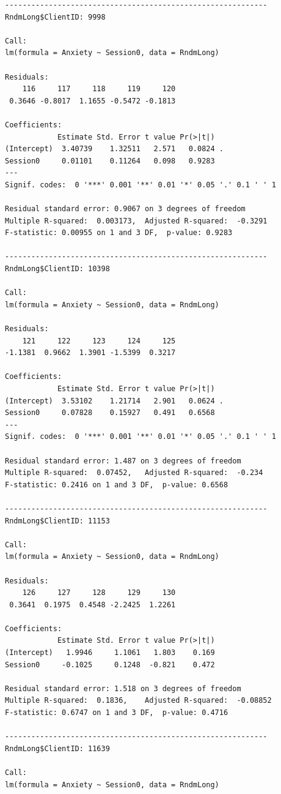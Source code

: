 \documentclass[
  11pt,
]{book}
\begin{document}
\begin{verbatim}
------------------------------------------------------------ 
RndmLong$ClientID: 9998

Call:
lm(formula = Anxiety ~ Session0, data = RndmLong)

Residuals:
    116     117     118     119     120 
 0.3646 -0.8017  1.1655 -0.5472 -0.1813 

Coefficients:
            Estimate Std. Error t value Pr(>|t|)  
(Intercept)  3.40739    1.32511   2.571   0.0824 .
Session0     0.01101    0.11264   0.098   0.9283  
---
Signif. codes:  0 '***' 0.001 '**' 0.01 '*' 0.05 '.' 0.1 ' ' 1

Residual standard error: 0.9067 on 3 degrees of freedom
Multiple R-squared:  0.003173,  Adjusted R-squared:  -0.3291 
F-statistic: 0.00955 on 1 and 3 DF,  p-value: 0.9283

------------------------------------------------------------ 
RndmLong$ClientID: 10398

Call:
lm(formula = Anxiety ~ Session0, data = RndmLong)

Residuals:
    121     122     123     124     125 
-1.1381  0.9662  1.3901 -1.5399  0.3217 

Coefficients:
            Estimate Std. Error t value Pr(>|t|)  
(Intercept)  3.53102    1.21714   2.901   0.0624 .
Session0     0.07828    0.15927   0.491   0.6568  
---
Signif. codes:  0 '***' 0.001 '**' 0.01 '*' 0.05 '.' 0.1 ' ' 1

Residual standard error: 1.487 on 3 degrees of freedom
Multiple R-squared:  0.07452,   Adjusted R-squared:  -0.234 
F-statistic: 0.2416 on 1 and 3 DF,  p-value: 0.6568

------------------------------------------------------------ 
RndmLong$ClientID: 11153

Call:
lm(formula = Anxiety ~ Session0, data = RndmLong)

Residuals:
    126     127     128     129     130 
 0.3641  0.1975  0.4548 -2.2425  1.2261 

Coefficients:
            Estimate Std. Error t value Pr(>|t|)
(Intercept)   1.9946     1.1061   1.803    0.169
Session0     -0.1025     0.1248  -0.821    0.472

Residual standard error: 1.518 on 3 degrees of freedom
Multiple R-squared:  0.1836,    Adjusted R-squared:  -0.08852 
F-statistic: 0.6747 on 1 and 3 DF,  p-value: 0.4716

------------------------------------------------------------ 
RndmLong$ClientID: 11639

Call:
lm(formula = Anxiety ~ Session0, data = RndmLong)


\end{verbatim}
\end{document}
